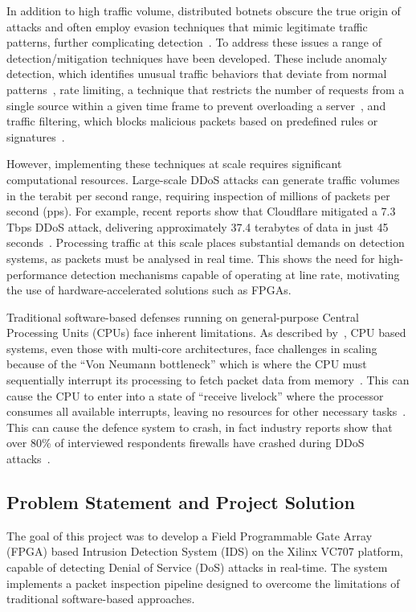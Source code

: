 In addition to high traffic volume, distributed botnets obscure the true origin of attacks and often employ evasion techniques that mimic legitimate traffic patterns, further complicating detection~\cite{arash_evolving_2025}. To address these issues a range of detection/mitigation techniques have been developed. These include anomaly detection, which identifies unusual traffic behaviors that deviate from normal patterns~\cite{garcia-teodoro_anomaly-based_2009}, rate limiting, a technique that restricts the number of requests from a single source within a given time frame to prevent overloading a server~\cite{wong_effectiveness_nodate}, and traffic filtering, which blocks malicious packets based on predefined rules or signatures~\cite{rajaboevich_comparative_2020}.

However, implementing these techniques at scale requires significant computational resources. Large-scale DDoS attacks can generate traffic volumes in the terabit per second range, requiring inspection of millions of packets per second (pps). For example, recent reports show that Cloudflare mitigated a 7.3 Tbps DDoS attack, delivering approximately 37.4 terabytes of data in just 45 seconds~\cite{noauthor_defending_2025}. Processing traffic at this scale places substantial demands on detection systems, as packets must be analysed in real time. This shows the need for high-performance detection mechanisms capable of operating at line rate, motivating the use of hardware-accelerated solutions such as FPGAs.


Traditional software-based defenses running on general-purpose Central Processing Units (CPUs) face inherent limitations. As described by~\cite{orosz_real-time_2025}, CPU based systems, even those with multi-core architectures, face challenges in scaling because of the ``Von Neumann bottleneck'' which is where the CPU must sequentially interrupt its processing to fetch packet data from memory~\cite{noauthor_can_nodate}. This can cause the CPU to enter into a state of ``receive livelock'' where the processor consumes all available interrupts, leaving no resources for other necessary tasks~\cite{mogul_eliminating_1997}. This can cause the defence system to crash, in fact industry reports show that over 80\% of interviewed respondents firewalls have crashed during DDoS attacks~\cite{noauthor_why_nodate}.


\subsection{Problem Statement and Project Solution}
The goal of this project was to develop a Field Programmable Gate Array (FPGA) based Intrusion Detection System (IDS) on the Xilinx VC707 platform, capable of detecting Denial of Service (DoS) attacks in real-time. The system implements a packet inspection pipeline designed to overcome the limitations of traditional software-based approaches.

